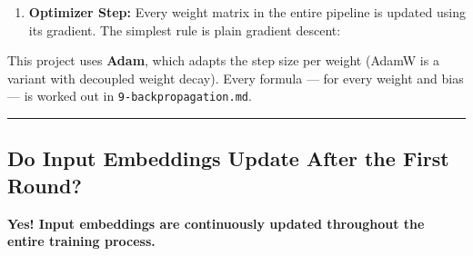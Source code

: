 \documentclass[11pt,a4paper,oneside]{report}
\providecommand{\tightlist}{\setlength{\itemsep}{0pt}\setlength{\parskip}{0pt}}
\begin{document}
\begin{center}\end{center}

\begin{enumerate}
\def\labelenumi{\arabic{enumi}.}
\setcounter{enumi}{3}
\tightlist
\item
  \textbf{Optimizer Step:} Every weight matrix in the entire pipeline is updated using its gradient. The simplest rule is plain gradient descent:
\end{enumerate}

\begin{center}\end{center}

This project uses \textbf{Adam}, which adapts the step size per weight (AdamW is a variant with decoupled weight decay). Every formula --- for every weight and bias --- is worked out in \texttt{9-backpropagation.\allowbreak{}md}.

\begin{center}\rule{0.5\linewidth}{0.5pt}\end{center}

\subsection{Do Input Embeddings Update After the First Round?}\label{do-input-embeddings-update-after-the-first-round}

\textbf{Yes! Input embeddings are continuously updated throughout the entire training process.}
\end{document}
